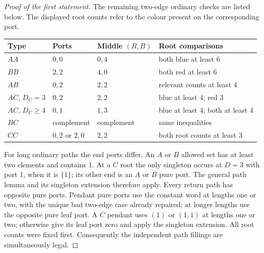 \begin{proof}[Proof of the first statement]
The remaining two-edge ordinary checks are listed below. The displayed
root counts refer to the colour present on the corresponding port.
\begin{center}\small
\begin{tabular}{llll}\toprule
Type&Ports&Middle $(R,B)$&Root comparisons\\\midrule
$AA$&$0,0$&$0,4$&both blue at least 6\\
$BB$&$2,2$&$4,0$&both red at least 6\\
$AB$&$0,2$&$2,2$&relevant counts at least 4\\
$AC$, $D_C=3$&$0,2$&$2,2$&blue at least 4; red 3\\
$AC$, $D_C\ge4$&$0,1$&$1,3$&blue at least 4; both at least 4\\
$BC$&complement&complement&same inequalities\\
$CC$&$0,2$ or $2,0$&$2,2$&both root counts at least 3\\\bottomrule
\end{tabular}
\end{center}
For long ordinary paths the end ports differ. An $A$ or $B$ allowed
set has at least two elements and contains 1. At a $C$ root the only
singleton occurs at $D=3$ with port 1, when it is $\{1\}$; its
other end is an $A$ or $B$ pure port. The general path lemma and its
singleton extension therefore apply. Every return path has opposite
pure ports. Pendant pure ports use the constant word at lengths one
or two, with the unique bad two-edge case already repaired; at longer
lengths use the opposite pure leaf port. A $C$ pendant uses $(1)$ or
$(1,1)$ at lengths one or two; otherwise give its leaf port zero and
apply the singleton extension. All root counts were fixed first.
Consequently the independent path fillings are simultaneously legal.
\end{proof}

